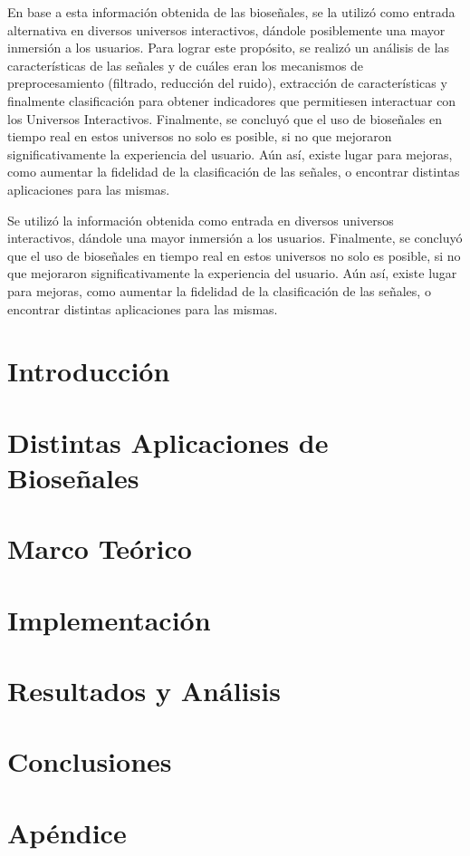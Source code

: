 \documentclass[a4paper]{report}
\begin{document}
En base a esta información obtenida de las bioseñales, se la utilizó como entrada alternativa en diversos universos interactivos, dándole posiblemente una mayor inmersión a los usuarios. Para lograr este propósito, se realizó un análisis de las características de las señales y de cuáles eran los mecanismos de preprocesamiento (filtrado, reducción del ruido), extracción de características y finalmente clasificación para obtener indicadores que permitiesen interactuar con los Universos Interactivos.   Finalmente, se concluyó que el uso de bioseñales en tiempo real en estos universos no solo es posible, si no que mejoraron significativamente la experiencia del usuario. Aún así, existe lugar para mejoras, como aumentar la fidelidad de la clasificación de las señales, o encontrar distintas aplicaciones para las mismas.

Se utilizó la información obtenida como entrada en diversos universos interactivos, dándole una mayor inmersión a los usuarios. Finalmente, se concluyó que el uso de bioseñales en tiempo real en estos universos no solo es posible, si no que mejoraron significativamente la experiencia del usuario. Aún así, existe lugar para mejoras, como aumentar la fidelidad de la clasificación de las señales, o encontrar distintas aplicaciones para las mismas.

\tableofcontents

\chapter{Introducción}


\chapter{Distintas Aplicaciones de Bioseñales} \label{chap:biosignal-apps}


\chapter{Marco Teórico}


\chapter{Implementación}


\chapter{Resultados y Análisis}



\chapter{Conclusiones}


\appendix
\chapter{Apéndice}

\printglossary[type=\acronymtype,title={Lista de Acrónimos}]

{}

\end{document}
